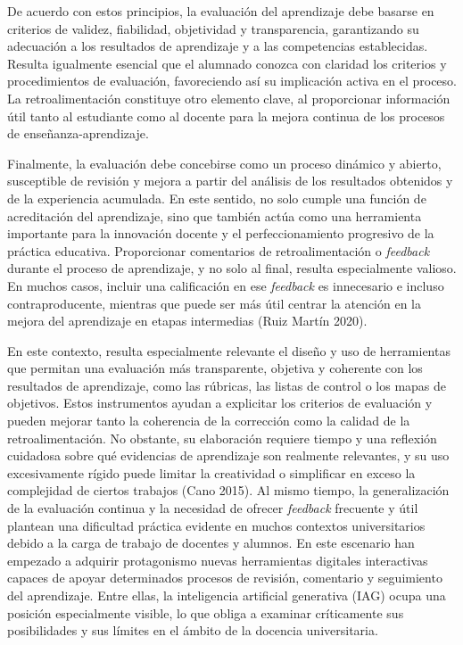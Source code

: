 \documentclass[
  11pt,
  a4paper,
  twoside]{scrreprt}
\begin{document}
De acuerdo con estos principios, la evaluación del aprendizaje debe
basarse en criterios de validez, fiabilidad, objetividad y
transparencia, garantizando su adecuación a los resultados de
aprendizaje y a las competencias establecidas. Resulta igualmente
esencial que el alumnado conozca con claridad los criterios y
procedimientos de evaluación, favoreciendo así su implicación activa en
el proceso. La retroalimentación constituye otro elemento clave, al
proporcionar información útil tanto al estudiante como al docente para
la mejora continua de los procesos de enseñanza-aprendizaje.

Finalmente, la evaluación debe concebirse como un proceso dinámico y
abierto, susceptible de revisión y mejora a partir del análisis de los
resultados obtenidos y de la experiencia acumulada. En este sentido, no
solo cumple una función de acreditación del aprendizaje, sino que
también actúa como una herramienta importante para la innovación docente
y el perfeccionamiento progresivo de la práctica educativa. Proporcionar
comentarios de retroalimentación o \emph{feedback} durante el proceso de
aprendizaje, y no solo al final, resulta especialmente valioso. En
muchos casos, incluir una calificación en ese \emph{feedback} es
innecesario e incluso contraproducente, mientras que puede ser más útil
centrar la atención en la mejora del aprendizaje en etapas intermedias
(Ruiz Martín 2020).

En este contexto, resulta especialmente relevante el diseño y uso de
herramientas que permitan una evaluación más transparente, objetiva y
coherente con los resultados de aprendizaje, como las rúbricas, las
listas de control o los mapas de objetivos. Estos instrumentos ayudan a
explicitar los criterios de evaluación y pueden mejorar tanto la
coherencia de la corrección como la calidad de la retroalimentación. No
obstante, su elaboración requiere tiempo y una reflexión cuidadosa sobre
qué evidencias de aprendizaje son realmente relevantes, y su uso
excesivamente rígido puede limitar la creatividad o simplificar en
exceso la complejidad de ciertos trabajos (Cano 2015). Al mismo tiempo,
la generalización de la evaluación continua y la necesidad de ofrecer
\emph{feedback} frecuente y útil plantean una dificultad práctica
evidente en muchos contextos universitarios debido a la carga de trabajo
de docentes y alumnos. En este escenario han empezado a adquirir
protagonismo nuevas herramientas digitales interactivas capaces de
apoyar determinados procesos de revisión, comentario y seguimiento del
aprendizaje. Entre ellas, la inteligencia artificial generativa (IAG)
ocupa una posición especialmente visible, lo que obliga a examinar
críticamente sus posibilidades y sus límites en el ámbito de la docencia
universitaria.
\end{document}
